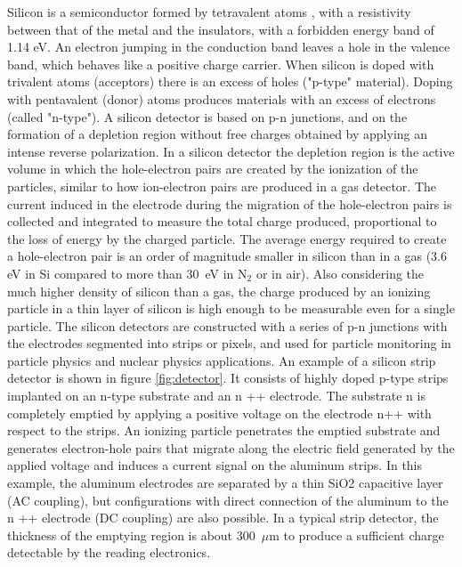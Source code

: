 \noindent Silicon is a semiconductor formed by tetravalent atoms \cite{detector}, with a resistivity between that of the metal and the insulators, with a forbidden energy band of 1.14 eV.
An electron jumping in the conduction band leaves a hole in the valence band, which behaves like a positive charge carrier.
When silicon is doped with trivalent atoms (acceptors) there is an excess of holes ("p-type" material).
Doping with pentavalent (donor) atoms produces materials with an excess of electrons (called "n-type").
\newline
A silicon detector is based on p-n junctions, and on the formation of a depletion region without free charges obtained by applying an intense reverse polarization.
In a silicon detector the depletion region is the active volume in which the hole-electron pairs are created by the ionization of the particles, similar to how ion-electron pairs are produced in a gas detector.
The current induced in the electrode during the migration of the hole-electron pairs is collected and integrated to measure the total charge produced, proportional to the loss of energy by the charged particle.
\newline
The average energy required to create a hole-electron pair is an order of magnitude smaller in silicon than in a gas (3.6 eV in Si compared to more than 30~eV in N$_2$ or in air).
Also considering the much higher density of silicon than a gas, the charge produced by an ionizing particle in a thin layer of silicon is high enough to be measurable even for a single particle.
\newline
The silicon detectors are constructed with a series of p-n junctions with the electrodes segmented into strips or pixels, and used for particle monitoring in particle physics and nuclear physics applications.
An example of a silicon strip detector is shown in figure \ref{fig:detector}. It consists of highly doped p-type strips implanted on an n-type substrate and an n ++ electrode.
The substrate n is completely emptied by applying a positive voltage on the electrode n++ with respect to the strips.
An ionizing particle penetrates the emptied substrate and generates electron-hole pairs that migrate along the electric field generated by the applied voltage and induces a current signal on the aluminum strips.
In this example, the aluminum electrodes are separated by a thin SiO2 capacitive layer (AC coupling), but configurations with direct connection of the aluminum to the n ++ electrode (DC coupling) are also possible.
In a typical strip detector, the thickness of the emptying region is about 300~$\mu$m to produce a sufficient charge detectable by the reading electronics. 
